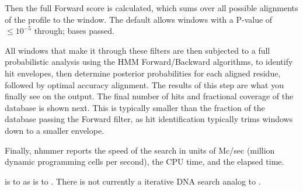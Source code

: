 Then the full Forward score is calculated, which sums over all
possible alignments of the profile to the window. The default allows
windows with a P-value of $\leq 10^{-5}$ through; \NMHnfwd{} bases
passed.

All windows that make it through these filters are then subjected to a
full probabilistic analysis using the HMM Forward/Backward algorithms,
to identify hit envelopes, then determine posterior probabilities for
each aligned residue, followed by optimal accuracy alignment. The
results of this step are what you finally see on the output. The final
number of hits and fractional coverage of the database is shown
next. This is typically smaller than the fraction of the database
passing the Forward filter, as hit identification typically trims
windows down to a smaller envelope.

Finally, nhmmer reports the speed of the search in units of Mc/sec
(million dynamic programming cells per second), the CPU time, and the
elapsed time.

 is to  as  is to
.  There is not currently a iterative DNA search
analog to .







